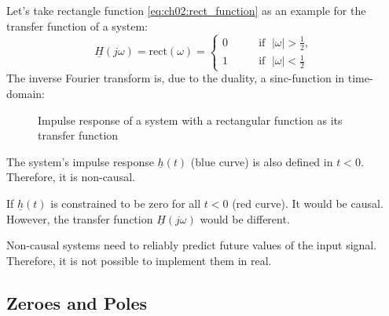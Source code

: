 \begin{refsection}
Let's take rectangle function \eqref{eq:ch02:rect_function} as an example for the transfer function of a system:
\begin{equation}
	\underline{H}\left(j \omega\right) = \mathrm{rect}(\omega) = \begin{cases}
		0 & \qquad \text{if } \; |\omega| > \frac{1}{2}, \\
		1 & \qquad \text{if } \; |\omega| < \frac{1}{2}
	\end{cases}
\end{equation}
The inverse Fourier transform is, due to the duality, a sinc-function in time-domain:
\begin{figure}[H]
	\centering
	\caption{Impulse response of a system with a rectangular function as its transfer function}
\end{figure}
The system's impulse response $\underline{h}(t)$ (blue curve) is also defined in $t < 0$. Therefore, it is non-causal.

If $\underline{h}(t)$ is constrained to be zero for all $t < 0$ (red curve). It would be causal. However, the transfer function $\underline{H}\left(j \omega\right)$ would be different.

\begin{fact}
	Non-causal systems need to reliably predict future values of the input signal. Therefore, it is not possible to implement them in real.
\end{fact}

\subsection{Zeroes and Poles}


\end{refsection}
